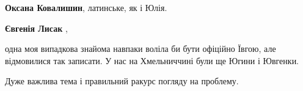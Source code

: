 \begin{itemize}
\begin{itemize}
 
\textbf{Оксана Ковалишин}, латинське, як і Юлія.

 
\textbf{Євгенія Лисак} , 

одна моя випадкова знайома навпаки воліла би бути офіційно Ївгою, але
відмовилися так записати. У нас на Хмельниччині були ще Югини і Ювгенки.

\end{itemize}

 
Дуже важлива тема і правильний ракурс погляду на проблему.

 


\end{itemize}
